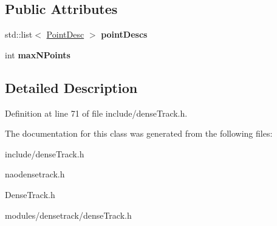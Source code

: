 \subsection*{Public Attributes}
\begin{DoxyCompactItemize}
\item 
\hypertarget{class_track_aeb24d749a37506a47dcd4d0a90783e81}{
std::list$<$ \hyperlink{class_point_desc}{PointDesc} $>$ {\bfseries pointDescs}}
\label{class_track_aeb24d749a37506a47dcd4d0a90783e81}

\item 
\hypertarget{class_track_a846ac5dbeefb2636a9d689fad2b89845}{
int {\bfseries maxNPoints}}
\label{class_track_a846ac5dbeefb2636a9d689fad2b89845}

\end{DoxyCompactItemize}


\subsection{Detailed Description}


Definition at line 71 of file include/denseTrack.h.



The documentation for this class was generated from the following files:\begin{DoxyCompactItemize}
\item 
include/denseTrack.h\item 
naodensetrack.h\item 
DenseTrack.h\item 
modules/densetrack/denseTrack.h\end{DoxyCompactItemize}
